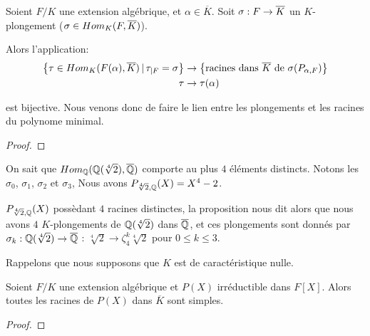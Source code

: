 
\begin{proposition}
	Soient $F/K$ une extension algébrique, et $\alpha \in \overline{K}$.
	Soit $\sigma : F \rightarrow \overline{K}$ un $K$-plongement ($\sigma \in
	Hom_{K}(F, \overline{K})$).

	Alors l'application:
	\begin{align}
		\left\{\tau \in Hom_{K}(F(\alpha), \overline{K}) \, | \, \tau_{|F} =
	\sigma \right\} &\rightarrow \left\{  \text{racines dans } \overline{K} \text{ de }
		\sigma(P_{\alpha, F}) \right\} \\
		\tau &\rightarrow \tau(\alpha)
	\end{align}

	est bijective. Nous venons donc de faire le lien entre les plongements et
	les racines du polynome minimal.
\end{proposition}

\ifdefined\outputproof
\begin{proof}

\end{proof}
\fi

\begin{exemple}
	On sait que
	$Hom_{\mathbb{Q}}(\mathbb{Q}(\sqrt[4]{2}), \overline{\mathbb{Q}})$
	comporte au plus $4$ éléments distincts. Notons les $\sigma_{0}$, $\sigma_{1}$,
	$\sigma_{2}$ et $\sigma_{3}$,
	Nous avons $P_{\sqrt[4]{2}, \mathbb{Q}}(X) = X^{4} - 2$.

	$P_{\sqrt[4]{2}, \mathbb{Q}}(X)$ possèdant $4$ racines distinctes, la
	proposition nous dit alors que nous avons $4$
	$K$-plongements de $\mathbb{Q}(\sqrt[4]{2})$ dans $\overline{\mathbb{Q}}$, et
	ces plongements sont donnés par
	$\sigma_{k} : \mathbb{Q}(\sqrt[4]{2}) \rightarrow \overline{\mathbb{Q}}$ :
	$\sqrt[4]{2} \rightarrow \zeta^{k}_{4} \sqrt[4]{2}$ pour $0 \leq k \leq 3$.
\end{exemple}

\begin{proposition}
	Rappelons que nous supposons que $K$ est de caractéristique nulle.

	Soient $F/K$ une extension algébrique et $P(X)$ irréductible dans $F[X]$.
	Alors toutes les racines de $P(X)$ dans $\overline{K}$ sont simples.
\end{proposition}

\ifdefined\outputproof
\begin{proof}

\end{proof}
\fi


